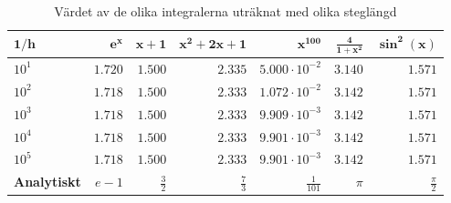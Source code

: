 \documentclass[a4paper,titlepage]{article}
\begin{document}
\begin{table}[h]
    \centering
    \begin{tabular}{l | r | r | r | r | r | r}
        $\mathbf{1/h}$      & $\mathbf{e^x}$ & $\mathbf{x + 1}$ & $\mathbf{x^2 + 2x + 1}$ & $\mathbf{x^{100}}$     & $\mathbf{\frac{4}{1 + x^2}}$ & $\mathbf{\sin^2(x)}$ \\ \hline
        $10^1$              & $1.720$        & $1.500$          & $2.335$                 & $5.000 \cdot 10^{-2}$ & $3.140$                      & $1.571$ \\
        $10^2$              & $1.718$        & $1.500$          & $2.333$                 & $1.072 \cdot 10^{-2}$ & $3.142$                      & $1.571$ \\
        $10^3$              & $1.718$        & $1.500$          & $2.333$                 & $9.909 \cdot 10^{-3}$ & $3.142$                      & $1.571$ \\
        $10^4$              & $1.718$        & $1.500$          & $2.333$                 & $9.901 \cdot 10^{-3}$ & $3.142$                      & $1.571$ \\
        $10^5$              & $1.718$        & $1.500$          & $2.333$                 & $9.901 \cdot 10^{-3}$ & $3.142$                      & $1.571$ \\ \hline
        \textbf{Analytiskt} & $e-1$          & $\frac{3}{2}$    & $\frac{7}{3}$           & $\frac{1}{101}$        & $\pi$                        & $\frac{\pi}{2}$
    \end{tabular}
    \caption{Värdet av de olika integralerna uträknat med olika steglängd}
    \label{tab:values}
\end{table}
\end{document}
